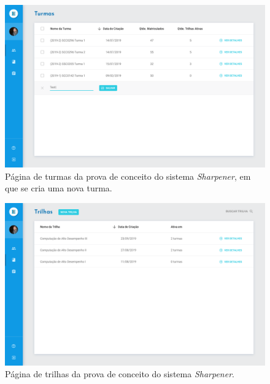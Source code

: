   \begin{figure}[htpb]
    \centering
    \includegraphics[width=\linewidth]{images/mocks/turmaNova.png}
    \caption{Página de turmas da prova de conceito do sistema \emph{Sharpener}, em que se 
    cria uma nova turma.}%
    \label{fig:turmasAdd}
  \end{figure}

  \begin{figure}[htpb]
  \centering
  \includegraphics[width=\linewidth]{images/mocks/track.png}
  \caption{Página de trilhas da prova de conceito do sistema \emph{Sharpener}.}%
  \label{fig:track}
  \end{figure}
  
